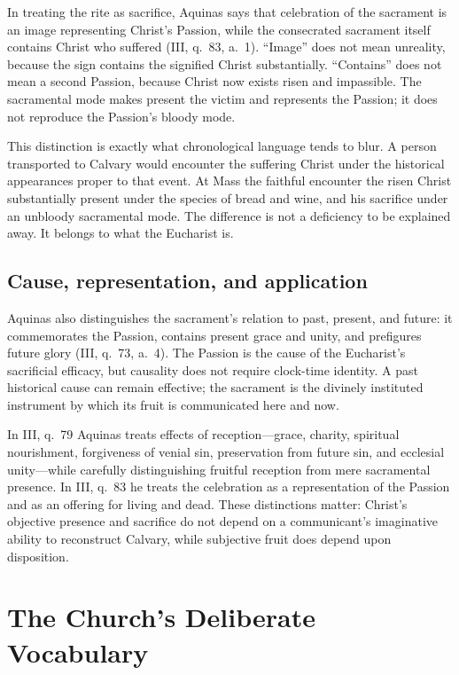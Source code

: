 \begin{deepstudy}
In treating the rite as sacrifice, Aquinas says that celebration of the
sacrament is an image representing Christ's Passion, while the consecrated
sacrament itself contains Christ who suffered (III, q.~83, a.~1). ``Image''
does not mean unreality, because the sign contains the signified Christ
substantially. ``Contains'' does not mean a second Passion, because Christ now
exists risen and impassible. The sacramental mode makes present the victim and
represents the Passion; it does not reproduce the Passion's bloody mode.

This distinction is exactly what chronological language tends to blur. A
person transported to Calvary would encounter the suffering Christ under the
historical appearances proper to that event. At Mass the faithful encounter
the risen Christ substantially present under the species of bread and wine,
and his sacrifice under an unbloody sacramental mode. The difference is not a
deficiency to be explained away. It belongs to what the Eucharist is.

\subsection*{Cause, representation, and application}

Aquinas also distinguishes the sacrament's relation to past, present, and
future: it commemorates the Passion, contains present grace and unity, and
prefigures future glory (III, q.~73, a.~4). The Passion is the cause of the
Eucharist's sacrificial efficacy, but causality does not require clock-time
identity. A past historical cause can remain effective; the sacrament is the
divinely instituted instrument by which its fruit is communicated here and
now.

In III, q.~79 Aquinas treats effects of reception---grace, charity, spiritual
nourishment, forgiveness of venial sin, preservation from future sin, and
ecclesial unity---while carefully distinguishing fruitful reception from
mere sacramental presence. In III, q.~83 he treats the celebration as a
representation of the Passion and as an offering for living and dead. These
distinctions matter: Christ's objective presence and sacrifice do not depend on
a communicant's imaginative ability to reconstruct Calvary, while subjective
fruit does depend upon disposition.

\section{The Church's Deliberate Vocabulary}


\end{deepstudy}
